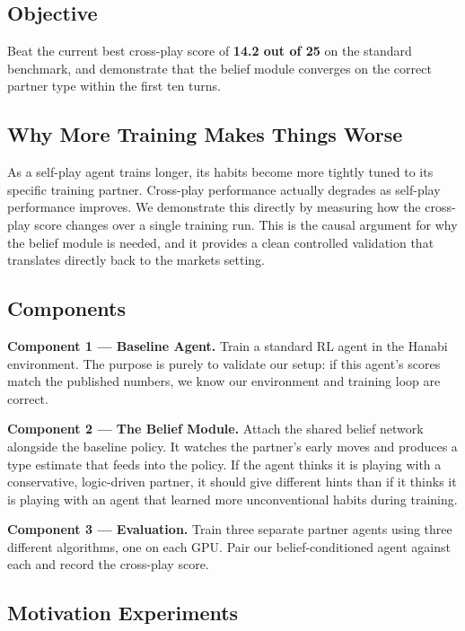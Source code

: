 \documentclass[11pt, a4paper]{article}
\begin{document}
\subsection{Objective}

Beat the current best cross-play score of \textbf{14.2 out of 25} on the standard benchmark, and demonstrate that the belief module converges on the correct partner type within the first ten turns.

\subsection{Why More Training Makes Things Worse}

As a self-play agent trains longer, its habits become more tightly tuned to its specific training partner. Cross-play performance actually degrades as self-play performance improves. We demonstrate this directly by measuring how the cross-play score changes over a single training run. This is the causal argument for why the belief module is needed, and it provides a clean controlled validation that translates directly back to the markets setting.

\subsection{Components}

\textbf{Component 1 --- Baseline Agent.} Train a standard RL agent in the Hanabi environment. The purpose is purely to validate our setup: if this agent's scores match the published numbers, we know our environment and training loop are correct.

\textbf{Component 2 --- The Belief Module.} Attach the shared belief network alongside the baseline policy. It watches the partner's early moves and produces a type estimate that feeds into the policy. If the agent thinks it is playing with a conservative, logic-driven partner, it should give different hints than if it thinks it is playing with an agent that learned more unconventional habits during training.

\textbf{Component 3 --- Evaluation.} Train three separate partner agents using three different algorithms, one on each GPU. Pair our belief-conditioned agent against each and record the cross-play score.

\subsection{Motivation Experiments}
\end{document}
